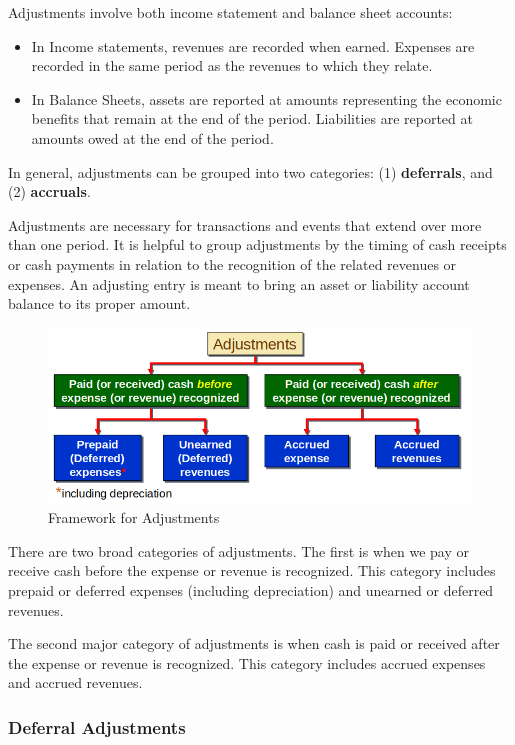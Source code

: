 \documentclass[../main.tex]{subfiles}
\begin{document}
	Adjustments involve both income statement and balance sheet accounts:
	\begin{itemize}[noitemsep]
		\item In Income statements, revenues are recorded when earned. Expenses 
		are recorded in the same period as the revenues to which they relate. 
		\item In Balance Sheets, assets are reported at amounts representing 
		the economic benefits that remain at the end of the period. Liabilities 
		are reported  at amounts owed at the end of the period. 
	\end{itemize}	
	In general, adjustments can be grouped into two categories: (1) 
	\textbf{deferrals}, and (2) \textbf{accruals}.
	
	Adjustments are necessary for transactions and events that extend over more 
	than one period. It is helpful to group adjustments by the timing of cash 
	receipts or cash payments in relation to the recognition of the related 
	revenues or expenses. An adjusting entry is meant to bring an asset or 
	liability account balance to its proper amount.  
	
	\begin{figure}[ht!]
		\centering
		\includegraphics[width=1\columnwidth]{images/c3/framework_for_adjustments.png}
		\caption{Framework for Adjustments}	
	\end{figure}
	
	There are two broad categories of adjustments. The first is when we pay or 
	receive cash before the expense or revenue is recognized. This category 
	includes prepaid or deferred expenses (including depreciation) and unearned 
	or deferred revenues.
	
	The second major category of adjustments is when cash is paid or received 
	after the expense or revenue is recognized. This category includes accrued 
	expenses and accrued revenues.
	
	\subsubsection{Deferral Adjustments}
	
\end{document}
